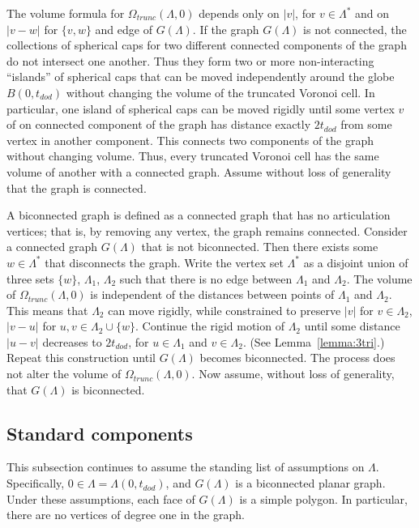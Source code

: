 \documentclass{article} %
\begin{document}
The volume formula for $\Omega_{trunc}(\Lambda,0)$ depends only on
$|v|$, for $v\in\Lambda^*$ and on $|v-w|$ for $\{v,w\}$ and edge of
$G(\Lambda)$. If the graph $G(\Lambda)$ is not connected, the
collections of spherical caps for two different connected components of
the graph do not intersect one another. Thus they form two or more
non-interacting ``islands'' of spherical caps that can be moved
independently around the globe $B(0,t_{dod})$ without changing the
volume of the truncated Voronoi cell. In particular, one island of
spherical caps can be moved rigidly until some vertex $v$ of on
connected component of the graph has distance exactly $2t_{dod}$ from
some vertex in another component. This connects two components of the
graph without changing volume. Thus, every truncated Voronoi cell has
the same volume of another with a connected graph. Assume without loss
of generality that the graph is connected.

A biconnected graph is defined as a connected graph that has no
articulation vertices; that is, by removing any vertex, the graph
remains connected. Consider a connected graph $G(\Lambda)$ that is not
biconnected. Then there exists some $w\in \Lambda^*$ that disconnects
the graph. Write the vertex set $\Lambda^*$ as a disjoint union of
three sets $\{w\}$, $\Lambda_1$, $\Lambda_2$ such that there is no
edge between $\Lambda_1$ and $\Lambda_2$. The volume of
$\Omega_{trunc}(\Lambda,0)$ is independent of the distances between
points of $\Lambda_1$ and $\Lambda_2$. This means that $\Lambda_2$ can
move rigidly, while constrained to preserve $|v|$ for $v\in\Lambda_2$,
$|v-u|$ for $u,v\in \Lambda_2\cup\{w\}$. Continue the rigid motion of
$\Lambda_2$ until some distance $|u-v|$ decreases to $2t_{dod}$, for
$u\in\Lambda_1$ and $v\in\Lambda_2$. (See Lemma~\ref{lemma:3tri}.)
Repeat this construction until $G(\Lambda)$ becomes biconnected. The
process does not alter the volume of $\Omega_{trunc}(\Lambda,0)$. Now
assume, without loss of generality, that $G(\Lambda)$ is biconnected.

\subsection{Standard components}

This subsection continues to assume the standing list of assumptions
on $\Lambda$. Specifically, $0\in\Lambda = \Lambda(0,t_{dod})$, and
$G(\Lambda)$ is a biconnected planar graph. Under these assumptions,
each face of $G(\Lambda)$ is a simple polygon. In particular, there
are no vertices of degree one in the graph.
\end{document}

